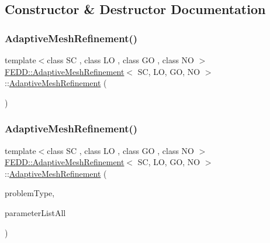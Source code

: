 \subsection{Constructor \& Destructor Documentation}
\mbox{\label{classFEDD_1_1AdaptiveMeshRefinement_a259e41c282b1db70f233ac94854ba8bd}} 
\subsubsection{\texorpdfstring{Adaptive\+Mesh\+Refinement()}{AdaptiveMeshRefinement()}\hspace{0.1cm}{\footnotesize\ttfamily [1/3]}}
{\footnotesize\ttfamily template$<$class SC , class LO , class GO , class NO $>$ \\
\hyperlink{classFEDD_1_1AdaptiveMeshRefinement}{F\+E\+D\+D\+::\+Adaptive\+Mesh\+Refinement}$<$ SC, LO, GO, NO $>$\+::\hyperlink{classFEDD_1_1AdaptiveMeshRefinement}{Adaptive\+Mesh\+Refinement} (\begin{DoxyParamCaption}{ }\end{DoxyParamCaption})}

\mbox{\label{classFEDD_1_1AdaptiveMeshRefinement_a6331efe29307723fb532acea922d8489}} 
\subsubsection{\texorpdfstring{Adaptive\+Mesh\+Refinement()}{AdaptiveMeshRefinement()}\hspace{0.1cm}{\footnotesize\ttfamily [2/3]}}
{\footnotesize\ttfamily template$<$class SC , class LO , class GO , class NO $>$ \\
\hyperlink{classFEDD_1_1AdaptiveMeshRefinement}{F\+E\+D\+D\+::\+Adaptive\+Mesh\+Refinement}$<$ SC, LO, GO, NO $>$\+::\hyperlink{classFEDD_1_1AdaptiveMeshRefinement}{Adaptive\+Mesh\+Refinement} (\begin{DoxyParamCaption}\item[{string}]{problem\+Type,  }\item[{Parameter\+List\+Ptr\+\_\+\+Type}]{parameter\+List\+All }\end{DoxyParamCaption})}

